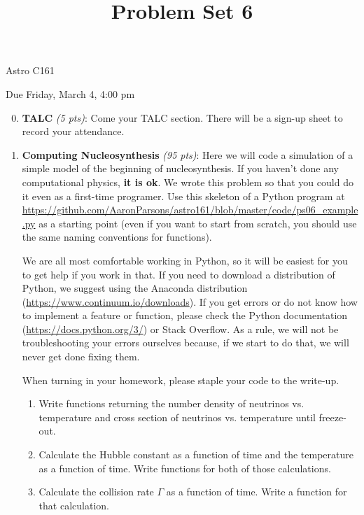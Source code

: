 \documentclass[12pt,preprint]{aastex}
\title{Problem Set 6}
\begin{document}
\maketitle
\centerline{Astro C161} 

\centerline{Due Friday, March 4, 4:00 pm}

\begin{enumerate}
\setcounter{enumi}{-1}

\item \textbf{TALC} \textit{(5 pts)}: Come your TALC section. There will be a sign-up sheet to record your attendance. 

\item \textbf{Computing Nucleosynthesis} \textit{(95 pts)}: Here we will code a simulation of a simple model of the beginning of nucleosynthesis. If you haven't done any computational physics, \textbf{it is ok}. We wrote this problem so that you could do it even as a first-time programer. Use this skeleton of a Python program at \url{https://github.com/AaronParsons/astro161/blob/master/code/ps06_example.py}
\normalsize as a starting point (even if you want to start from scratch, you should use the same naming conventions for functions). 

We are all most comfortable working in Python, so it will be easiest for you to get help if you work in that. If you need to download a distribution of Python, we suggest using the Anaconda distribution (\url{https://www.continuum.io/downloads}). If you get errors or do not know how to implement a feature or function, please check the Python documentation (\url{https://docs.python.org/3/}) or Stack Overflow. As a rule, we will not be troubleshooting your errors ourselves because, if we start to do that, we will never get done fixing them.

When turning in your homework, please staple your code to the write-up.
 
\begin{enumerate}
	\item Write functions returning the number density of neutrinos vs. temperature
 and cross section of neutrinos vs. temperature until freeze-out.
 
	\item Calculate the Hubble constant as a function of time and the temperature as a function of time. Write functions for both of those calculations.

	\item Calculate the collision rate $\Gamma$ as a function of time. Write a function for that calculation.
	

\end{enumerate}
\end{enumerate}
\end{document}
